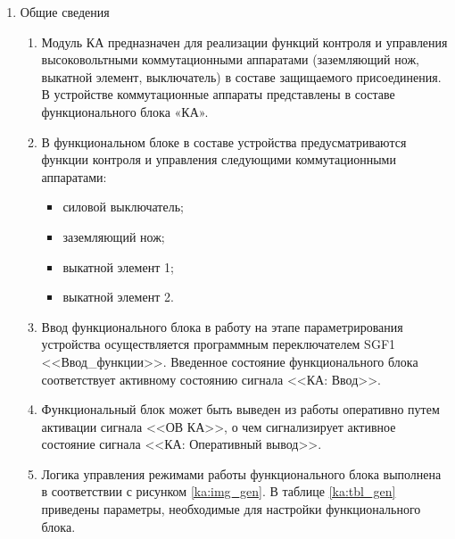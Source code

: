 
\color{black}

\begin{enumerate}

\item Общие сведения

\begin{enumerate}

\item
Модуль КА предназначен для реализации функций контроля и управления высоковольтными коммутационными аппаратами (заземляющий нож, выкатной элемент, выключатель) в составе защищаемого присоединения. В устройстве коммутационные аппараты представлены в составе функционального блока «КА».

\item
В функциональном блоке в составе устройства предусматриваются функции контроля и управления следующими коммутационными аппаратами:
\begin{itemize}
    \item силовой выключатель;
    \item заземляющий нож;
    \item выкатной элемент 1;
    \item выкатной элемент 2.
\end{itemize}

\item
Ввод функционального блока в работу на этапе параметрирования устройства осуществляется программным переключателем SGF1 <<Ввод\_функции>>. Введенное состояние функционального блока соответствует активному состоянию сигнала <<КА: Ввод>>.
\item
Функциональный блок может быть выведен из работы оперативно путем активации сигнала <<ОВ КА>>, о чем сигнализирует активное состояние сигнала <<КА: Оперативный вывод>>.
\item
Логика управления режимами работы функционального блока выполнена в соответствии с рисунком \ref{ka:img_gen}. В таблице \ref{ka:tbl_gen} приведены параметры, необходимые для настройки функционального блока. 


\end{enumerate}
\end{enumerate}
